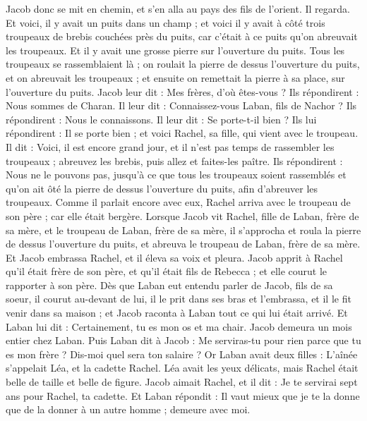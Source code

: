 \begin{multicols}{2}
\VerseOne{}Jacob donc se mit en chemin, et s'en alla au pays des fils de l'orient.
Il regarda. Et voici, il y avait un puits dans un champ ; et voici il y avait à côté trois troupeaux de brebis couchées près du puits, car c'était à ce puits qu'on abreuvait les troupeaux. Et il y avait une grosse pierre sur l'ouverture du puits.
Tous les troupeaux se rassemblaient là ; on roulait la pierre de dessus l'ouverture du puits, et on abreuvait les troupeaux ; et ensuite on remettait la pierre à sa place, sur l'ouverture du puits.
Jacob leur dit : Mes frères, d'où êtes-vous ? Ils répondirent : Nous sommes de Charan.
Il leur dit : Connaissez-vous Laban, fils de Nachor ? Ils répondirent : Nous le connaissons.
Il leur dit : Se porte-t-il bien ? Ils lui répondirent : Il se porte bien ; et voici Rachel, sa fille, qui vient avec le troupeau.
Il dit : Voici, il est encore grand jour, et il n'est pas temps de rassembler les troupeaux ; abreuvez les brebis, puis allez et faites-les paître.
Ils répondirent : Nous ne le pouvons pas, jusqu'à ce que tous les troupeaux soient rassemblés et qu'on ait ôté la pierre de dessus l'ouverture du puits, afin d'abreuver les troupeaux.
Comme il parlait encore avec eux, Rachel arriva avec le troupeau de son père ; car elle était bergère.
Lorsque Jacob vit Rachel, fille de Laban, frère de sa mère, et le troupeau de Laban, frère de sa mère, il s'approcha et roula la pierre de dessus l'ouverture du puits, et abreuva le troupeau de Laban, frère de sa mère.
Et Jacob embrassa Rachel, et il éleva sa voix et pleura.
Jacob apprit à Rachel qu'il était frère de son père, et qu'il était fils de Rebecca ; et elle courut le rapporter à son père.
Dès que Laban eut entendu parler de Jacob, fils de sa soeur, il courut au-devant de lui, il le prit dans ses bras et l'embrassa, et il le fit venir dans sa maison ; et Jacob raconta à Laban tout ce qui lui était arrivé.
Et Laban lui dit : Certainement, tu es mon os et ma chair. Jacob demeura un mois entier chez Laban.
Puis Laban dit à Jacob : Me serviras-tu pour rien parce que tu es mon frère ? Dis-moi quel sera ton salaire ?
Or Laban avait deux filles : L'aînée s'appelait Léa, et la cadette Rachel.
Léa avait les yeux délicats, mais Rachel était belle de taille et belle de figure.
Jacob aimait Rachel, et il dit : Je te servirai sept ans pour Rachel, ta cadette.
Et Laban répondit : Il vaut mieux que je te la donne que de la donner à un autre homme ; demeure avec moi.

\end{multicols}
